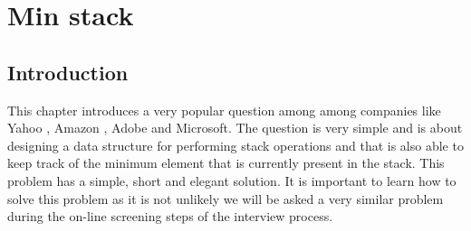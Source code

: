 %

\chapter{Min stack}
\label{ch:min_stack}
\section*{Introduction}
This chapter introduces a very popular question among among companies like Yahoo , Amazon , Adobe and Microsoft. The question is very simple and is about designing a data structure for performing stack operations and that is also able to keep track of the minimum element that is currently present in the stack. This problem has a simple, short and elegant solution. It is important to learn how to solve this problem as it is not unlikely we will be asked a very similar problem during the on-line screening steps of the interview process.


